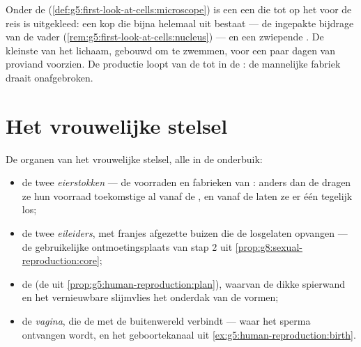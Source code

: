 \begin{example}\label{ex:g8:reproductive-systems:sperm}
Onder de 
(\cref{def:g5:first-look-at-cells:microscope}) is een  een  die
tot op het  voor de reis is uitgekleed: een kop die bijna helemaal uit
 bestaat --- de ingepakte bijdrage van de vader
(\cref{rem:g5:first-look-at-cells:nucleus}) --- en een zwiepende .
De kleinste  van het lichaam, gebouwd om te zwemmen, voor een paar
dagen van proviand voorzien. De productie loopt van de  tot in de
: de mannelijke fabriek draait onafgebroken.
\end{example}

\section{Het vrouwelijke stelsel}

\begin{definition}\label{def:g8:reproductive-systems:female}
De organen van het vrouwelijke stelsel, alle in de onderbuik:
\begin{itemize}
  \item de twee \emph{eierstokken} --- de voorraden en
        fabrieken van : anders dan de  dragen ze hun
        voorraad toekomstige \emph{} al vanaf de , en
        vanaf de  laten ze er één tegelijk los;
  \item de twee \emph{eileiders}, met franjes afgezette
        buizen die de losgelaten  opvangen --- de gebruikelijke
        ontmoetingsplaats van stap 2 uit
        \cref{prop:g8:sexual-reproduction:core};
  \item de \emph{} (de  uit
        \cref{prop:g5:human-reproduction:plan}), waarvan de dikke
        spierwand en het vernieuwbare slijmvlies het onderdak van de
         vormen;
  \item de \emph{vagina}, die de  met de buitenwereld verbindt
        --- waar het sperma ontvangen wordt, en het geboortekanaal uit
        \cref{ex:g5:human-reproduction:birth}.
\end{itemize}
\end{definition}

